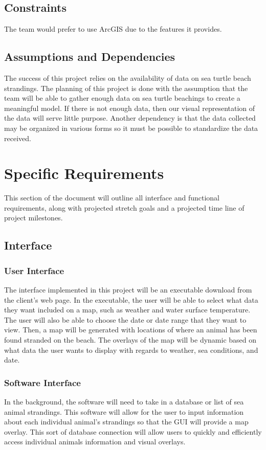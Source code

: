 \documentclass[onecolumn, draftclsnofoot,10pt, compsoc]{IEEEtran}
\begin{document}
\begin{singlespace}
\subsection{Constraints}
The team would prefer to use ArcGIS due to the features it provides. 
\subsection{Assumptions and Dependencies}
The success of this project relies on the availability of data on sea turtle beach strandings. The planning of this project is done with the assumption that the team will be able to gather enough data on sea turtle beachings to create a meaningful model. If there is not enough data, then our visual representation of the data will serve little purpose. \newline 
Another dependency is that the data collected may be organized in various forms so it must be possible to standardize the data received. 
\section{Specific Requirements}
This section of the document will outline all interface and functional requirements, along with projected stretch goals and a projected time line of project milestones.
\subsection{Interface}
\subsubsection{User Interface}The interface implemented in this project will be an executable download from the client's web page. In the executable, the user will be able to select what data they want included on a map, such as weather and water surface temperature. The user will also be able to choose the date or date range that they want to view.  Then, a map will be generated with locations of where an animal has been found stranded on the beach.  The overlays of the map will be dynamic based on what data the user wants to display with regards to weather, sea conditions, and date.
\subsubsection{Software Interface}
In the background, the software will need to take in a database or list of 
sea animal strandings. This software will allow for the user to input information about each individual animal's strandings so that the GUI will provide a map overlay. This sort of database connection will allow users to quickly and efficiently access individual animals information and visual overlays.

\end{singlespace}
\end{document}
